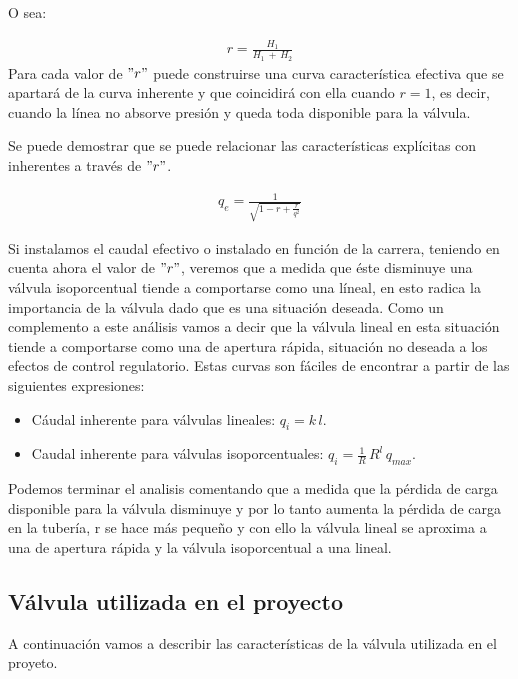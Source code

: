 \begin{itemize}
   O sea:
   
   \begin{align}
	r = \frac{H_1}{H_1\,+\,H_2}
    \end{align} 
  Para cada valor de ${"r"}$ puede construirse una curva característica efectiva que se
  apartará de la curva inherente y que coincidirá con ella cuando ${r=1}$,
  es decir, cuando la línea no absorve presión y queda toda disponible para la válvula.
  
  Se puede demostrar que se puede relacionar las características explícitas
  con inherentes a través de ${"r"}$.
  
  \begin{align}
	q_e = \frac{1}{\sqrt{1-r+\frac{r}{q^2}}}
  \end{align}
  
  Si instalamos el caudal efectivo o instalado en función de la carrera, teniendo
  en cuenta ahora el valor de ${"r"}$, veremos que a medida que éste disminuye una válvula
  isoporcentual tiende a comportarse como una líneal, en esto radica la importancia
  de la válvula dado que es una situación deseada. Como un complemento a este análisis
  vamos a decir que la válvula lineal en esta situación tiende a comportarse como
  una de apertura rápida, situación no deseada a los efectos de control regulatorio.
  Estas curvas son fáciles de encontrar a partir de las siguientes expresiones:
  
  \begin{itemize}
      \item Cáudal inherente para válvulas lineales: $q_i = k\,l$.
      \item Caudal inherente para válvulas isoporcentuales: $q_i = \frac{1}{R}\,R^l\,q_{max}$.
    \end{itemize}
  Podemos terminar el analisis comentando que a medida que la pérdida de carga disponible
  para la válvula disminuye y por lo tanto aumenta la pérdida de carga en la
  tubería, r se hace más pequeño y con ello la válvula lineal se aproxima a una de apertura rápida
  y la válvula isoporcentual a una lineal.
  
\end{itemize}

\subsection{Válvula utilizada en el proyecto}

A continuación vamos a describir las características de la válvula utilizada 
en el proyeto.


